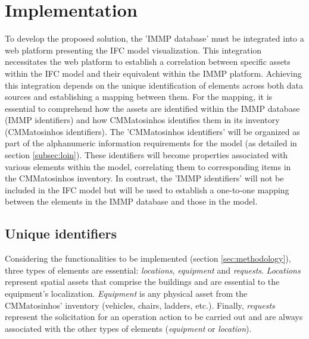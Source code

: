 \documentclass[a4paper, 10pt, twocolumn, twoside]{article}
\begin{document}
\section{Implementation}
\label{sec:implementation}

To develop the proposed solution, the 'IMMP database' must be integrated into a web platform presenting the IFC model visualization. This integration necessitates the web platform to establish a correlation between specific assets within the IFC model and their equivalent within the IMMP platform. Achieving this integration depends on the unique identification of elements across both data sources and establishing a mapping between them. For the mapping, it is essential to comprehend how the assets are identified within the IMMP database (IMMP identifiers) and how CMMatosinhos identifies them in its inventory (CMMatosinhos identifiers). The 'CMMatosinhos identifiers' will be organized as part of the alphanumeric information requirements for the model (as detailed in section \ref{subsec:loin}). These identifiers will become properties associated with various elements within the model, correlating them to corresponding items in the CMMatosinhos inventory. In contrast, the 'IMMP identifiers' will not be included in the IFC model but will be used to establish a one-to-one mapping between the elements in the IMMP database and those in the model.

\subsection{Unique identifiers}
\label{subsec:identifiers}

Considering the functionalities to be implemented (section \ref{sec:methodology}), three types of elements are essential: \emph{locations}, \emph{equipment} and \emph{requests}. \emph{Locations} represent spatial assets that comprise the buildings and are essential to the equipment's localization. \emph{Equipment} is any physical asset from the CMMatosinhos' inventory (vehicles, chairs, ladders, etc.). Finally, \emph{requests} represent the solicitation for an operation action to be carried out and are always associated with the other types of elements (\emph{equipment} or \emph{location}).
\end{document}
